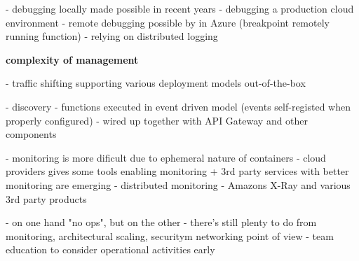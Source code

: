 - debugging locally made possible in recent years
- debugging a production cloud environment - remote debugging possible by in Azure (breakpoint remotely running function) - relying on distributed logging

\textbf{complexity of management} 

- traffic shifting supporting various deployment models out-of-the-box

- discovery - functions executed in event driven model (events self-registed when properly configured) - wired up together with API Gateway and other components

- monitoring is more dificult due to ephemeral nature of containers - cloud providers gives some tools enabling monitoring + 3rd party services with better monitoring are emerging
- distributed monitoring - Amazons X-Ray and various 3rd party products

- on one hand "no ops", but on the other - there's still plenty to do from monitoring, architectural scaling, securitym networking point of view - team education to consider operational activities early



 



